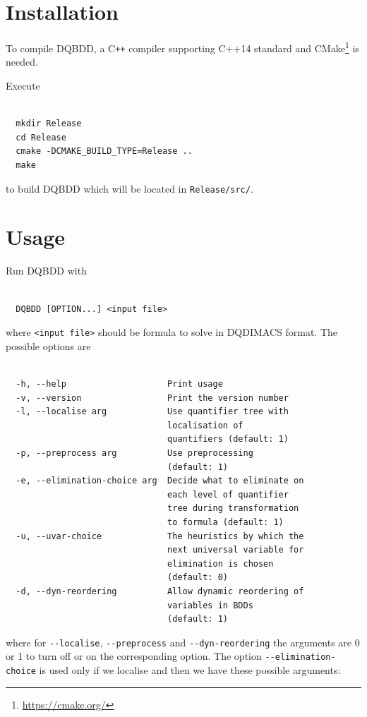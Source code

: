 \documentclass[
  digital, %
  color,
  twoside, %
  table,   %
  nolof,     %
  nolot,     %
]{fithesis3}
\theoremstyle{definition}
\theoremstyle{remark}
\newcommand{\Cplusplus}{C\texttt{++}}
\begin{document}
\section{Installation}
To compile DQBDD, a \Cplusplus{} compiler supporting C++14 standard and CMake\footnote{\url{https://cmake.org/}} is needed.

\newpage
\noindent Execute
\begin{verbatim}

  mkdir Release
  cd Release
  cmake -DCMAKE_BUILD_TYPE=Release ..
  make

\end{verbatim}
to build DQBDD which will be located in \verb|Release/src/|.

\section{Usage}
Run DQBDD with
\begin{verbatim}

  DQBDD [OPTION...] <input file>

\end{verbatim}
where \verb|<input file>| should be formula to solve in DQDIMACS format. The possible options are
\begin{verbatim}

  -h, --help                    Print usage
  -v, --version                 Print the version number
  -l, --localise arg            Use quantifier tree with
                                localisation of
                                quantifiers (default: 1)
  -p, --preprocess arg          Use preprocessing
                                (default: 1)
  -e, --elimination-choice arg  Decide what to eliminate on
                                each level of quantifier
                                tree during transformation
                                to formula (default: 1)
  -u, --uvar-choice             The heuristics by which the
                                next universal variable for
                                elimination is chosen
                                (default: 0)
  -d, --dyn-reordering          Allow dynamic reordering of
                                variables in BDDs
                                (default: 1)

\end{verbatim}
where for \verb|--localise|, \verb|--preprocess| and \verb|--dyn-reordering| the arguments are 0 or 1 to turn off or on the corresponding option. The option \verb|--elimination-choice| is used only if we localise and then we have these possible arguments:
\end{document}
